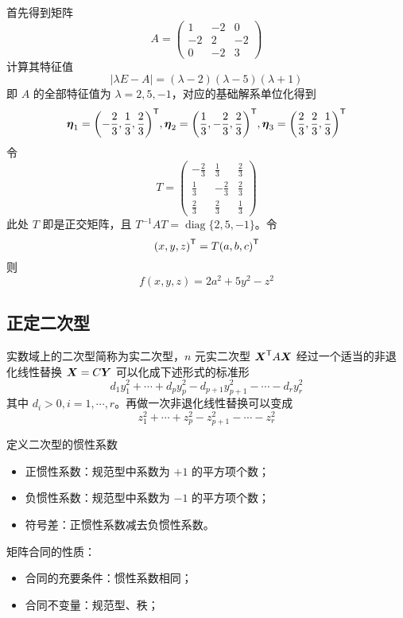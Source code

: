 \begin{solution}
	首先得到矩阵
	\[ A = \left(\begin{matrix}
				1 & -2 & 0 \\ -2 & 2 & -2 \\ 0 & -2 & 3
			\end{matrix}\right) \]
	计算其特征值
	\[ |\lambda E -A| = (\lambda - 2)(\lambda - 5)(\lambda + 1) \]
	即 $A$ 的全部特征值为 $\lambda = 2, 5, -1$，对应的基础解系单位化得到
	\[ \boldsymbol{\eta}_1 = {\left(-\frac{2}{3}, \frac{1}{3}, \frac{2}{3}\right)}^\mathsf{T}, \boldsymbol{\eta}_2 = {\left(\frac{1}{3}, -\frac{2}{3}, \frac{2}{3}\right)}^\mathsf{T}, \boldsymbol{\eta}_3 = {\left(\frac{2}{3}, \frac{2}{3}, \frac{1}{3}\right)}^\mathsf{T}  \]
	令
	\[ T = \left(\begin{matrix}
				-\frac{2}{3} & \frac{1}{3}  & \frac{2}{3} \\
				\frac{1}{3}  & -\frac{2}{3} & \frac{2}{3} \\
				\frac{2}{3}  & \frac{2}{3}  & \frac{1}{3}
			\end{matrix}\right) \]
	此处 $T$ 即是正交矩阵，且 $T^{-1}AT = \operatorname{diag}\{2, 5, -1\}$。令
	\[ {\left(x, y, z\right)}^\mathsf{T} = T {\left(a, b, c\right)}^\mathsf{T} \]
	则
	\[ f(x, y, z) = 2a^2 + 5y^2 - z^2 \]
\end{solution}

\subsection{正定二次型}

实数域上的二次型简称为实二次型，$n$ 元实二次型 ${\boldsymbol{X}}^\mathsf{T}A\boldsymbol{X}$ 经过一个适当的非退化线性替换 $\boldsymbol{X} = C\boldsymbol{Y}$ 可以化成下述形式的标准形
\[ d_1y_1^2+\cdots+d_py_p^2-d_{p+1}y_{p+1}^2-\cdots-d_ry_r^2 \]
其中 $d_i>0,i=1,\cdots,r$。再做一次非退化线性替换可以变成
\[ z_1^2+\cdots+z_p^2-z_{p+1}^2-\cdots-z_r^2 \]

定义二次型的惯性系数
\begin{itemize}
	\item 正惯性系数：规范型中系数为 $+1$ 的平方项个数；
	\item 负惯性系数：规范型中系数为 $-1$ 的平方项个数；
	\item 符号差：正惯性系数减去负惯性系数。
\end{itemize}

矩阵合同的性质：
\begin{itemize}
	\item 合同的充要条件：惯性系数相同；
	\item 合同不变量：规范型、秩；
\end{itemize}

